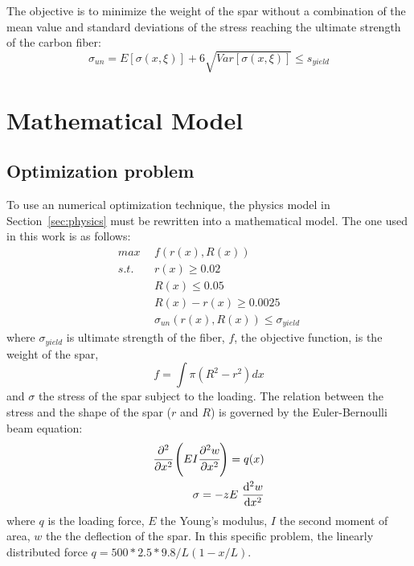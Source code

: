 \documentclass[a4paper]{article}
\begin{document}
The objective is to minimize the weight of the spar without a combination of the mean value and standard deviations of the stress reaching the ultimate strength of the carbon fiber:
\begin{equation}
\sigma_{un} = E[\sigma(x,\xi)] + 6\sqrt{Var[\sigma(x,\xi)]} \le s_{yield}
\end{equation}
\section{Mathematical Model}
\subsection{Optimization problem}
To use an numerical optimization technique, the physics model in Section~\ref{sec:physics} must be rewritten into a mathematical model. The one used in this work is as follows:
\begin{equation} \label{eq:math_model_1}
\begin{aligned}
max\:\: &f(r(x), R(x)) \\
s.t.\:\: & r(x) \ge 0.02 \\
         & R(x) \le 0.05 \\
         & R(x)-r(x) \ge 0.0025 \\
         &\sigma_{un}(r(x), R(x)) \le \sigma_{yield}
\end{aligned}
\end{equation}
where $\sigma_{yield}$ is ultimate strength of the fiber, $f$, the objective function, is the weight of the spar, 
\begin{equation*}
f = \int \pi (R^2 - r^2) dx
\end{equation*}
and $\sigma$ the stress of the spar subject to the loading. The relation between the stress and the shape of the spar ($r$ and $R$) is governed by the Euler-Bernoulli beam equation:
\begin{equation}\label{pde}
\begin{aligned}
{\cfrac  {\partial ^{2}}{\partial x^{2}}}\left(EI{\cfrac  {\partial ^{2}w}{\partial x^{2}}}\right)=q(x)\\
\sigma =-zE~{\frac  {{\mathrm  {d}}^{2}w}{{\mathrm  {d}}x^{2}}}
\end{aligned}
\end{equation}
where $q$ is the loading force, $E$ the Young's modulus, $I$ the second moment of area, $w$ the the deflection of the spar. In this specific problem, the linearly distributed force $q=500*2.5*9.8/L (1-x/L)$.
\end{document}

